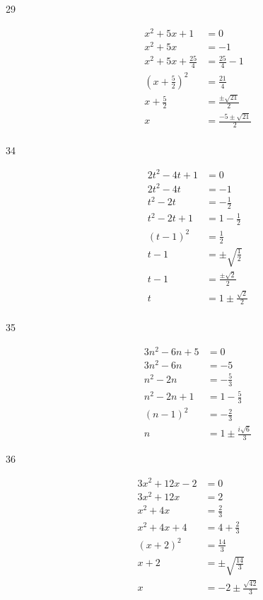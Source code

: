 \documentclass[fleqn,addpoints]{exam}
\begin{document}
\begin{description}
\item[29] 
\begin{align*}
  x^2 + 5x + 1 &= 0 \\
  x^2 + 5x &= -1 \\
  x^2 + 5x + \frac{25}{4} &= \frac{25}{4} - 1 \\
  \left( x + \frac{5}{2} \right)^2 &= \frac{21}{4} \\
  x + \frac{5}{2} &= \frac{\pm \sqrt{21}}{2} \\
  x &= \frac{-5 \pm \sqrt{21}}{2} \\
\end{align*}

\item[34] 
\begin{align*}
  2t^2 - 4t + 1 &= 0 \\
  2t^2 - 4t &= -1 \\
  t^2 - 2t &= - \frac{1}{2} \\
  t^2 - 2t + 1 &= 1 - \frac{1}{2} \\
  (t-1)^2 &= \frac{1}{2} \\
  t-1 &= \pm \sqrt{\frac{1}{2}} \\
  t-1 &= \frac{\pm \sqrt{2}}{2} \\
  t &= 1 \pm \frac{\sqrt{2}}{2} \\
\end{align*}

\item[35] 
\begin{align*}
  3n^2 - 6n + 5 &= 0 \\
  3n^2 - 6n  &= -5 \\
  n^2 - 2n  &= - \frac{5}{3} \\
  n^2 - 2n + 1 &= 1 - \frac{5}{3} \\
  (n-1)^2 &= - \frac{2}{3} \\
  n &= 1 \pm \frac{i \sqrt{6}}{3}
\end{align*}

\item[36] 
\begin{align*}
  3x^2 + 12x - 2 &= 0 \\
  3x^2 + 12x &= 2 \\
  x^2 + 4x &= \frac{2}{3} \\
  x^2 + 4x + 4 &= 4 + \frac{2}{3} \\
  (x+2)^2 &= \frac{14}{3} \\
  x+2 &= \pm \sqrt{\frac{14}{3}} \\
  x &= -2 \pm {\frac{\sqrt{42}}{3}} \\
\end{align*}


\end{description}
\end{document}
